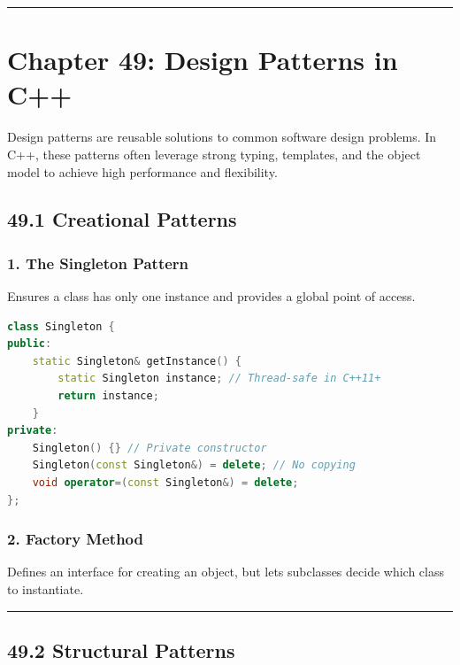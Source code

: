\begin{center}\rule{0.5\linewidth}{0.5pt}\end{center}

\hypertarget{chapter-49-design-patterns-in-c}{%
\section{Chapter 49: Design Patterns in
C++}\label{chapter-49-design-patterns-in-c}}

Design patterns are reusable solutions to common software design
problems. In C++, these patterns often leverage strong typing,
templates, and the object model to achieve high performance and
flexibility.

\hypertarget{creational-patterns}{%
\subsection{49.1 Creational Patterns}\label{creational-patterns}}

\hypertarget{the-singleton-pattern}{%
\subsubsection{1. The Singleton Pattern}\label{the-singleton-pattern}}

Ensures a class has only one instance and provides a global point of
access.

\begin{lstlisting}[language={C++}]
class Singleton {
public:
    static Singleton& getInstance() {
        static Singleton instance; // Thread-safe in C++11+
        return instance;
    }
private:
    Singleton() {} // Private constructor
    Singleton(const Singleton&) = delete; // No copying
    void operator=(const Singleton&) = delete;
};
\end{lstlisting}

\hypertarget{factory-method}{%
\subsubsection{2. Factory Method}\label{factory-method}}

Defines an interface for creating an object, but lets subclasses decide
which class to instantiate.

\begin{center}\rule{0.5\linewidth}{0.5pt}\end{center}

\hypertarget{structural-patterns}{%
\subsection{49.2 Structural Patterns}\label{structural-patterns}}

